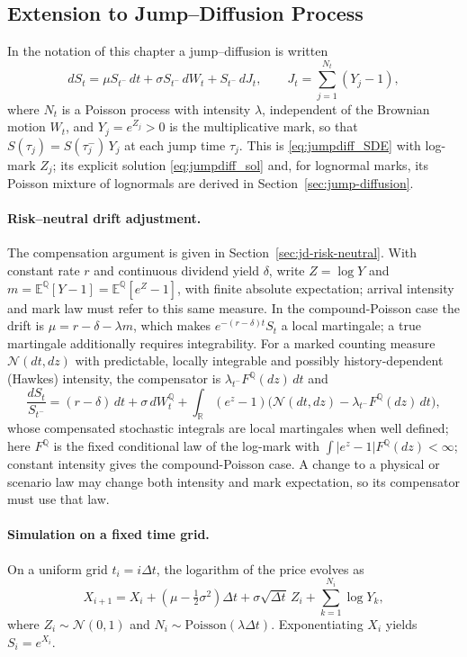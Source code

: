 \subsection{Extension to Jump--Diffusion Process} 

In the notation of this chapter a jump--diffusion is written
\[
dS_t = \mu S_{t^-}\,dt + \sigma S_{t^-}\,dW_t + S_{t^-}\,dJ_t,
\qquad J_t = \sum_{j=1}^{N_t}(Y_j - 1),
\]
where $N_t$ is a Poisson process with intensity $\lambda$, independent of the Brownian motion $W_t$, and $Y_j=e^{Z_j}>0$ is the multiplicative mark, so that $S(\tau_j)=S(\tau_j^-)\,Y_j$ at each jump time $\tau_j$. This is \eqref{eq:jumpdiff_SDE} with log-mark $Z_j$; its explicit solution \eqref{eq:jumpdiff_sol} and, for lognormal marks, its Poisson mixture of lognormals are derived in Section~\ref{sec:jump-diffusion}.

\paragraph{Risk--neutral drift adjustment.}
The compensation argument is given in Section~\ref{sec:jd-risk-neutral}. With constant rate $r$ and continuous dividend yield $\delta$, write $Z=\log Y$ and $m=\mathbb E^{\mathbb Q}[Y-1]=\mathbb E^{\mathbb Q}[e^Z-1]$, with finite absolute expectation; arrival intensity and mark law must refer to this same measure. In the compound-Poisson case the drift is $\mu=r-\delta-\lambda m$, which makes $e^{-(r-\delta)t}S_t$ a local martingale; a true martingale additionally requires integrability. For a marked counting measure $\mathcal N(dt,dz)$ with predictable, locally integrable and possibly history-dependent (Hawkes) intensity, the compensator is $\lambda_{t^-}F^{\mathbb Q}(dz)\,dt$ and
\[
\frac{dS_t}{S_{t^-}}=(r-\delta)\,dt+\sigma\,dW_t^{\mathbb Q}
+\int_{\mathbb R}(e^z-1)
\bigl(\mathcal N(dt,dz)-\lambda_{t^-}F^{\mathbb Q}(dz)\,dt\bigr),
\]
whose compensated stochastic integrals are local martingales when well defined; here $F^{\mathbb Q}$ is the fixed conditional law of the log-mark with $\int|e^z-1|F^{\mathbb Q}(dz)<\infty$; constant intensity gives the compound-Poisson case. A change to a physical or scenario law may change both intensity and mark expectation, so its compensator must use that law.

\paragraph{Simulation on a fixed time grid.}
On a uniform grid \(t_i=i\Delta t\), the logarithm of the price evolves as
\[
X_{i+1} = X_i + (\mu - \tfrac{1}{2}\sigma^2)\Delta t
+ \sigma\sqrt{\Delta t}\,Z_i
+ \sum_{k=1}^{N_i}\log Y_k,
\]
where \(Z_i\sim\mathcal N(0,1)\) and \(N_i\sim\text{Poisson}(\lambda\Delta t)\).  
Exponentiating \(X_i\) yields \(S_i=e^{X_i}\).




